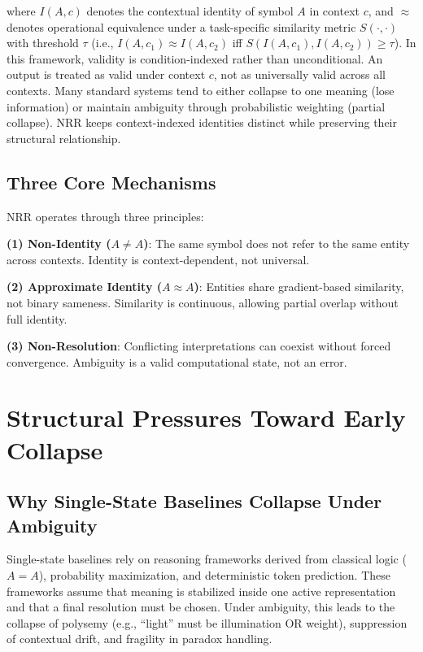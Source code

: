 \documentclass[11pt,a4paper]{article}
\begin{document}
where $I(A, c)$ denotes the contextual identity of symbol $A$ in context $c$, and $\approx$ denotes operational equivalence under a task-specific similarity metric $S(\cdot,\cdot)$ with threshold $\tau$ (i.e., $I(A, c_1) \approx I(A, c_2)$ iff $S(I(A, c_1), I(A, c_2)) \ge \tau$).
In this framework, validity is condition-indexed rather than unconditional.
An output is treated as valid under context $c$, not as universally valid across all contexts.
Many standard systems tend to either collapse to one meaning (lose information) or maintain ambiguity through probabilistic weighting (partial collapse).
NRR keeps context-indexed identities distinct while preserving their structural relationship.

\subsection{Three Core Mechanisms}

NRR operates through three principles:

\textbf{(1) Non-Identity ($A \neq A$)}: The same symbol does not refer to the same entity across contexts.
Identity is context-dependent, not universal.

\textbf{(2) Approximate Identity ($A \approx A$)}: Entities share gradient-based similarity, not binary sameness.
Similarity is continuous, allowing partial overlap without full identity.

\textbf{(3) Non-Resolution}: Conflicting interpretations can coexist without forced convergence.
Ambiguity is a valid computational state, not an error.

\section{Structural Pressures Toward Early Collapse}

\subsection{Why Single-State Baselines Collapse Under Ambiguity}

Single-state baselines rely on reasoning frameworks derived from classical logic ($A = A$), probability maximization, and deterministic token prediction.
These frameworks assume that meaning is stabilized inside one active representation and that a final resolution must be chosen.
Under ambiguity, this leads to the collapse of polysemy (e.g., ``light'' must be illumination OR weight), suppression of contextual drift, and fragility in paradox handling.
\end{document}
